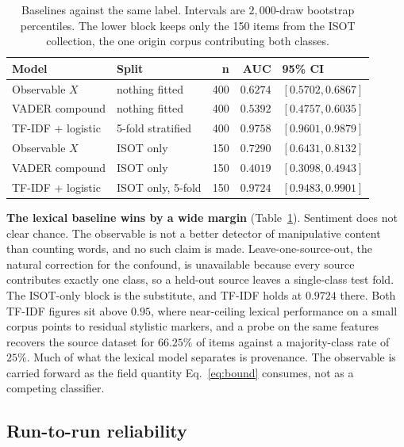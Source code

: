 \documentclass[preprint,12pt]{elsarticle}
\begin{document}
\begin{table}[htbp]
\centering
\begin{tabular}{@{}llrrl@{}}
\toprule
\textbf{Model} & \textbf{Split} & \textbf{n} & \textbf{AUC} & \textbf{95\% CI} \\
\midrule
Observable $X$     & nothing fitted    & 400 & $0.6274$ & $[0.5702, 0.6867]$ \\
VADER compound     & nothing fitted    & 400 & $0.5392$ & $[0.4757, 0.6035]$ \\
TF-IDF + logistic  & 5-fold stratified & 400 & $0.9758$ & $[0.9601, 0.9879]$ \\
\midrule
Observable $X$     & ISOT only         & 150 & $0.7290$ & $[0.6431, 0.8132]$ \\
VADER compound     & ISOT only         & 150 & $0.4019$ & $[0.3098, 0.4943]$ \\
TF-IDF + logistic  & ISOT only, 5-fold & 150 & $0.9724$ & $[0.9483, 0.9901]$ \\
\bottomrule
\end{tabular}
\caption{Baselines against the same label. Intervals are $2{,}000$-draw bootstrap
percentiles. The lower block keeps only the 150 items from the ISOT collection, the one
origin corpus contributing both classes.}
\label{tab:baselines}
\end{table}

\textbf{The lexical baseline wins by a wide margin} (Table~\ref{tab:baselines}). Sentiment
does not clear chance. The observable is not a better detector of manipulative content than
counting words, and no such claim is made. Leave-one-source-out, the natural correction for
the confound, is unavailable because every source contributes exactly one class, so a
held-out source leaves a single-class test fold. The ISOT-only block is the substitute, and
TF-IDF holds at $0.9724$ there. Both TF-IDF figures sit above $0.95$, where near-ceiling
lexical performance on a small corpus points to residual stylistic markers, and a probe on
the same features recovers the source dataset for $66.25\%$ of items against a
majority-class rate of $25\%$. Much of what the lexical model separates is provenance. The
observable is carried forward as the field quantity Eq.~\eqref{eq:bound} consumes, not as a
competing classifier.

\subsection{Run-to-run reliability}
\label{sec:reliability}
\end{document}
